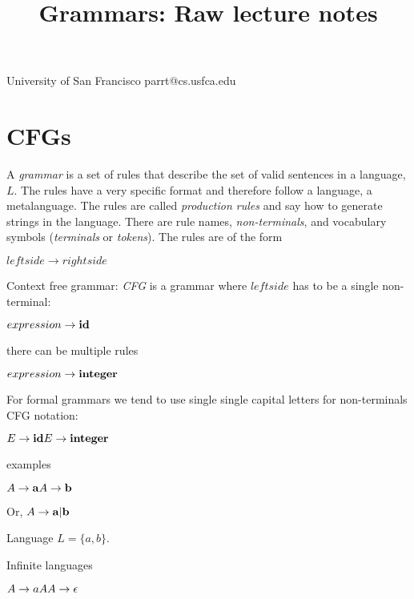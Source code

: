 \documentclass[11pt,twocolumn,nocopyright]{sigplanconf}
\begin{document}
\title{Grammars: Raw lecture notes}

           {University of San Francisco\vspace{-1mm}}
           {parrt@cs.usfca.edu}

\maketitle

\begin{abstract}
\end{abstract}

\section{CFGs}

A {\em grammar} is a set of rules that describe the set of valid sentences in a language, $L$. The rules have a very specific format and therefore follow a language, a metalanguage. The rules are called {\em production rules} and say how to generate strings in the language. There are rule names, {\em non-terminals}, and vocabulary symbols ({\em terminals} or {\em tokens}). The rules are of the form

$leftside \rightarrow rightside$

Context free grammar: {\em CFG} is a grammar where $leftside$ has to be a single non-terminal:

$expression \rightarrow {\bf id}$

there can be multiple rules

$expression \rightarrow {\bf integer}$

For formal grammars we tend to use single single capital letters for non-terminals CFG notation:

\noindent $
E \rightarrow {\bf id} \\
E \rightarrow {\bf integer}$

 examples
 
\noindent $
A \rightarrow {\bf a} \\
A \rightarrow {\bf b} \\
$

Or, $A \rightarrow {\bf a} | {\bf b}$

Language $L = \{a,b\}$.

 Infinite languages
 
 \noindent $
A \rightarrow a A \\
A \rightarrow \epsilon \\
$
\end{document}
